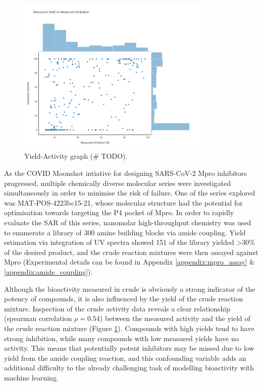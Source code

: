 \begin{figure}[!t]
    \centering
    \includegraphics[width=0.85\textwidth]{Chapters/Crude/Figs/yield_vs_activity.pdf}
    \caption{Yield-Activity graph (\# TODO).}
    \label{fig:yield_activity}
\end{figure}

As the COVID Moonshot intiative for designing SARS-CoV-2 Mpro inhibitors progressed, multiple chemically diverse molecular series were investigated simultaneously in order to minimise the risk of failure. One of the series explored was MAT-POS-4223bc15-21, whose molecular structure had the potential for optimisation towards targeting the P4 pocket of Mpro. In order to rapidly evaluate the SAR of this series, nanomolar high-throughput chemistry was used to enumerate a library of 300 amine building blocks via amide coupling. Yield estimation via integration of UV spectra showed 151 of the library yielded >30\% of the desired product, and the crude reaction mixtures were then assayed against Mpro (Experimental details can be found in Appendix \ref{appendix:mpro_assay} \& \ref{appendix:amide_coupling}).

Although the bioactivity measured in crude is obviously a strong indicator of the potency of compounds, it is also influenced by the yield of the crude reaction mixture. Inspection of the crude activity data reveals a clear relationship (spearman correlation $\rho = 0.54$) between the measured activity and the yield of the crude reaction mixture (Figure \ref{fig:yield_activity}). Compounds with high yields tend to have strong inhibition, while many compounds with low measured yields have no activity. This means that potentially potent inhibitors may be missed due to low yield from the amide coupling reaction, and this confounding variable adds an additional difficulty to the already challenging task of modelling bioactivity with machine learning. 

